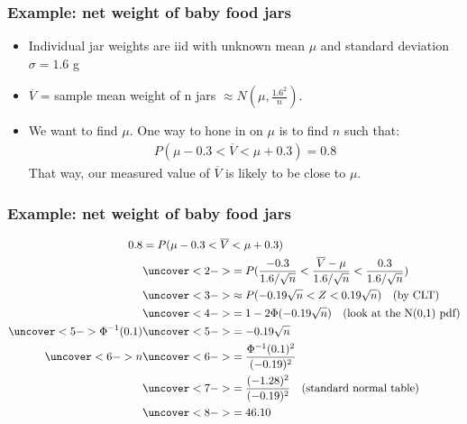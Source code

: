 \documentclass[handout]{beamer}\usepackage[]{graphicx}\usepackage[]{color}
\providecommand{\nv}{{}^{-1}}
\providecommand{\ov}[1]{\overline{#1}}
\numberwithin{equation}{section}
\begin{document}
\begin{frame}
\frametitle{Example: net weight of baby food jars}
\begin{itemize}
\item Individual jar weights are iid with unknown mean $\mu$ and standard deviation $\sigma = 1.6$ g 
\pause \item $\ov{V}$ = sample mean weight of n jars $\approx N \left (\mu, \frac{1.6^2}{n} \right )$.
\pause \item We want to find $\mu$. One way to hone in on $\mu$ is to find $n$ such that:
\pause \begin{align*}
P(\mu - 0.3 < \ov{V} < \mu + 0.3) = 0.8
\end{align*}
\pause That way, our measured value of $\ov{V}$ is likely to be close to $\mu$. 
\end{itemize}
\end{frame}

\begin{frame}
\frametitle{Example: net weight of baby food jars} \small
\begin{align*}
0.8 &= P(\mu - 0.3 < \ov{V} < \mu + 0.3) \\
&\uncover<2->{= P(\frac{-0.3}{1.6/\sqrt{n}} < \frac{\ov{V} - \mu}{1.6/\sqrt{n}} < \frac{0.3}{1.6/\sqrt{n}} )} \\
&\uncover<3->{\approx P(-0.19 \sqrt{n} < Z < 0.19 \sqrt{n} ) \quad \text{(by CLT)} }\\
&\uncover<4->{= 1 - 2\Phi(-0.19 \sqrt{n}) \quad \text{(look at the N(0,1) pdf)}} \\
\uncover<5->{\Phi \nv (0.1)} & \uncover<5->{= -0.19 \sqrt{n} }\\
\uncover<6->{n} & \uncover<6->{= \frac{\Phi \nv (0.1)^2}{(-0.19)^2}} \\
&\uncover<7->{= \frac{(-1.28)^2}{(-0.19)^2} \quad \text{(standard normal table)}} \\
&\uncover<8->{= 46.10}
\end{align*}
\begin{itemize}
\end{itemize}
\end{frame}
\end{document}
